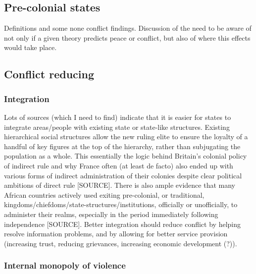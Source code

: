 \documentclass[12pt]{article}
\begin{document}
\begin{multicols}{2}
\subsection{Pre-colonial states}

Definitions and some none conflict findings. Discussion of the need to be aware
of not only if a given theory predicts peace or conflict, but also of where this
effects would take place.

\subsection{Conflict reducing}

\subsubsection{Integration}

Lots of sources (which I need to find) indicate that it is easier for states to
integrate areas/people with existing state or state-like structures. Existing
hierarchical social structures allow the new ruling elite to ensure the loyalty
of a handful of key figures at the top of the hierarchy, rather than subjugating
the population as a whole. This essentially the logic behind Britain's colonial
policy of indirect rule and why France often (at least de facto) also ended up
with various forms of indirect administration of their colonies despite clear
political ambitions of direct rule [SOURCE]. There is also ample evidence that
many African countries actively used exiting pre-colonial, or traditional,
kingdoms/chiefdoms/state-structures/institutions, officially or unofficially, to
administer their realms, especially in the period immediately following
independence [SOURCE]. Better integration should reduce conflict by helping
resolve information problems, and by allowing for better service provision
(increasing trust, reducing grievances, increasing economic development (?)).

\subsubsection{Internal monopoly of violence}


\end{multicols}
\end{document}
